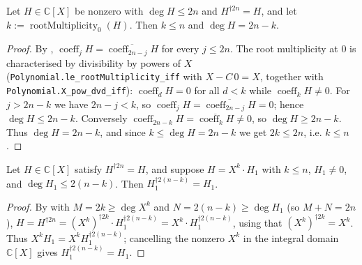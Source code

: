 \begin{lemma}
    \label{lem:fr-zero-mult-le}
    \leanok
    Let $H \in \mathbb{C}[X]$ be nonzero with $\deg H \le 2n$ and
    $H^{\dagger 2n} = H$, and let $k := \operatorname{rootMultiplicity}_0(H)$.
    Then $k \le n$ and $\deg H = 2n - k$.
\end{lemma}
\begin{proof}
    By , $\operatorname{coeff}_j H
    = \overline{\operatorname{coeff}_{2n-j} H}$ for every $j \le 2n$. The root
    multiplicity at $0$ is characterised by divisibility by powers of $X$
    (\texttt{Polynomial.le\_rootMultiplicity\_iff} with $X - C\,0 = X$, together
    with \texttt{Polynomial.X\_pow\_dvd\_iff}): $\operatorname{coeff}_d H = 0$ for
    all $d < k$ while $\operatorname{coeff}_k H \neq 0$. For $j > 2n - k$ we have
    $2n - j < k$, so $\operatorname{coeff}_j H = \overline{\operatorname{coeff}_{2n-j} H}
    = 0$; hence $\deg H \le 2n - k$. Conversely
    $\operatorname{coeff}_{2n-k} H = \overline{\operatorname{coeff}_k H} \neq 0$,
    so $\deg H \ge 2n - k$. Thus $\deg H = 2n - k$, and since
    $k \le \deg H = 2n - k$ we get $2k \le 2n$, i.e. $k \le n$.
\end{proof}

\begin{lemma}
    \label{lem:fr-zero-factor-selfinv}
    \leanok
    Let $H \in \mathbb{C}[X]$ satisfy $H^{\dagger 2n} = H$, and suppose
    $H = X^{k}\cdot H_1$ with $k \le n$, $H_1 \neq 0$, and $\deg H_1 \le 2(n-k)$.
    Then $H_1^{\dagger 2(n-k)} = H_1$.
\end{lemma}
\begin{proof}
    By  with $M = 2k \ge \deg X^{k}$ and
    $N = 2(n-k) \ge \deg H_1$ (so $M + N = 2n$),
    $H = H^{\dagger 2n} = (X^{k})^{\dagger 2k}\cdot H_1^{\dagger 2(n-k)}
    = X^{k}\cdot H_1^{\dagger 2(n-k)}$, using  that
    $(X^{k})^{\dagger 2k} = X^{k}$. Thus $X^{k} H_1 = X^{k} H_1^{\dagger 2(n-k)}$;
    cancelling the nonzero $X^{k}$ in the integral domain $\mathbb{C}[X]$ gives
    $H_1^{\dagger 2(n-k)} = H_1$.
\end{proof}

